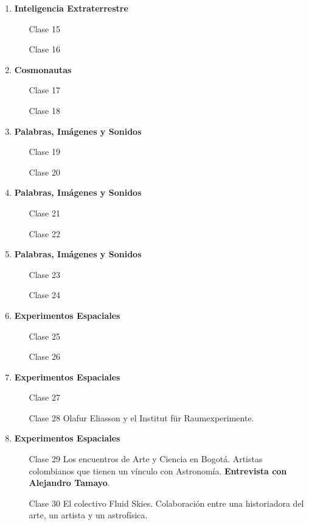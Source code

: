 \documentclass{report}
\begin{document}
\begin{enumerate}
\item {\bf Inteligencia Extraterrestre}
\begin{itemize}
\item[Clase 15]
\item[Clase 16]
\end{itemize}

\item {\bf Cosmonautas}
\begin{itemize}
\item[Clase 17]
\item[Clase 18]
\end{itemize}

\item {\bf Palabras, Im\'agenes y Sonidos}
\begin{itemize}
\item[Clase 19]
\item[Clase 20]
\end{itemize}

\item {\bf Palabras, Im\'agenes y Sonidos}
\begin{itemize}
\item[Clase 21]
\item[Clase 22]
\end{itemize}

\item {\bf Palabras, Im\'agenes y Sonidos}
\begin{itemize}
\item[Clase 23]
\item[Clase 24]
\end{itemize}

\item {\bf Experimentos Espaciales}
\begin{itemize}
\item[Clase 25]
\item[Clase 26]
\end{itemize}

\item {\bf Experimentos Espaciales}
\begin{itemize}
\item[Clase 27]
\item[Clase 28] Olafur Eliasson y el Institut f\"ur Raumexperimente.
\end{itemize}

\item {\bf Experimentos Espaciales}
\begin{itemize}
\item[Clase 29] Los encuentros de Arte y Ciencia en Bogot\'a. Artistas
  colombianos que tienen un v\'inculo con Astronom\'ia. {\bf
    Entrevista con Alejandro Tamayo}.
\item[Clase 30] El colectivo Fluid Skies. Colaboraci\'on entre una
  historiadora del arte, un artista y un astrof\'isica.
\end{itemize}

\end{enumerate}
\end{document}

